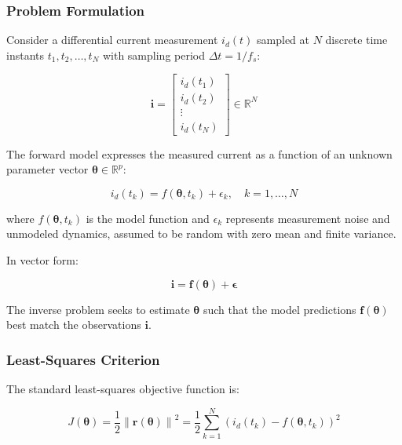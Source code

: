 \documentclass[12pt,a4paper]{article}
\newcommand{\norm}[1]{\left\lVert#1\right\rVert}
\begin{document}
\subsubsection{Problem Formulation}

Consider a differential current measurement $i_d(t)$ sampled at $N$ discrete time 
instants $t_1, t_2, \ldots, t_N$ with sampling period $\Delta t = 1/f_s$:

\begin{equation}
\mathbf{i} = \begin{bmatrix} i_d(t_1) \\ i_d(t_2) \\ \vdots \\ i_d(t_N) \end{bmatrix} \in \mathbb{R}^{N}
\label{eq:meas_vector}
\end{equation}

The forward model expresses the measured current as a function of an unknown parameter 
vector $\boldsymbol{\theta} \in \mathbb{R}^p$:

\begin{equation}
i_d(t_k) = f(\boldsymbol{\theta}, t_k) + \epsilon_k, \quad k = 1, \ldots, N
\label{eq:forward_general}
\end{equation}

where $f(\boldsymbol{\theta}, t_k)$ is the model function and $\epsilon_k$ represents 
measurement noise and unmodeled dynamics, assumed to be random with zero mean and 
finite variance.

In vector form:

\begin{equation}
\mathbf{i} = \mathbf{f}(\boldsymbol{\theta}) + \boldsymbol{\epsilon}
\label{eq:forward_vector}
\end{equation}

The inverse problem seeks to estimate $\boldsymbol{\theta}$ such that the model predictions 
$\mathbf{f}(\boldsymbol{\theta})$ best match the observations $\mathbf{i}$.

\subsubsection{Least-Squares Criterion}

The standard least-squares objective function is:

\begin{equation}
J(\boldsymbol{\theta}) = \frac{1}{2} \norm{\mathbf{r}(\boldsymbol{\theta})}^2 = \frac{1}{2} \sum_{k=1}^{N} \left( i_d(t_k) - f(\boldsymbol{\theta}, t_k) \right)^2
\label{eq:lse_objective}
\end{equation}
\end{document}
